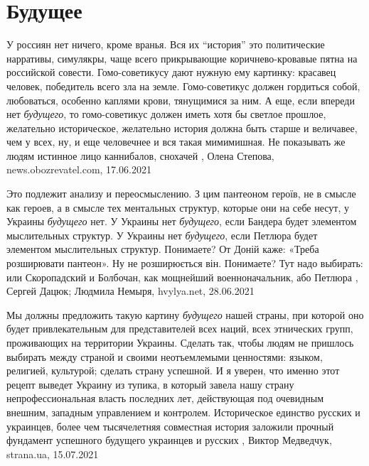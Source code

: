  
 
 
 
 
\chapter{Будущее}
\label{sec:slova.buduschee}

У россиян нет ничего, кроме вранья. Вся их \enquote{история} это политические
нарративы, симулякры, чаще всего прикрывающие коричнево-кровавые пятна на
российской совести. Гомо-советикусу дают нужную ему картинку: красавец человек,
победитель всего зла на земле. Гомо-советикус должен гордиться собой,
любоваться, особенно каплями крови, тянущимися за ним.  А еще, если впереди нет
\emph{будущего}, то гомо-советикус должен иметь хотя бы светлое прошлое, желательно
историческое, желательно история должна быть старше и величавее, чем у всех,
ну, и еще человечнее и вся такая мимимишная. Не показывать же людям истинное
лицо каннибалов, снохачей
, 
Олена Степова, news.obozrevatel.com, 17.06.2021

Это подлежит анализу и переосмыслению. З цим пантеоном героїв, не в смысле как
героев, а в смысле тех ментальных структур, которые они на себе несут, у
Украины \emph{будущего} нет. У Украины нет \emph{будущего}, если Бандера будет элементом
мыслительных структур. У Украины нет \emph{будущего}, если Петлюра будет элементом
мыслительных структур. Понимаете? От Доній каже: «Треба розширювати пантеон».
Ну не розширюється він. Понимаете? Тут надо выбирать: или Скоропадский и
Болбочан, как мощнейший военноначальник, або Петлюра
, 
Сергей Дацюк; Людмила Немыря, hvylya.net, 28.06.2021

Мы должны предложить такую картину \emph{будущего} нашей страны, при которой оно будет
привлекательным для представителей всех наций, всех этнических групп,
проживающих на территории Украины. Сделать так, чтобы людям не пришлось
выбирать между страной и своими неотъемлемыми ценностями: языком, религией,
культурой; сделать страну успешной. И я уверен, что именно этот рецепт выведет
Украину из тупика, в который завела нашу страну непрофессиональная власть
последних лет, действующая под очевидным внешним, западным управлением и
контролем.  Историческое единство русских и украинцев, более чем тысячелетняя
совместная история заложили прочный фундамент успешного будущего украинцев и
русских
, 
Виктор Медведчук, strana.ua, 15.07.2021
